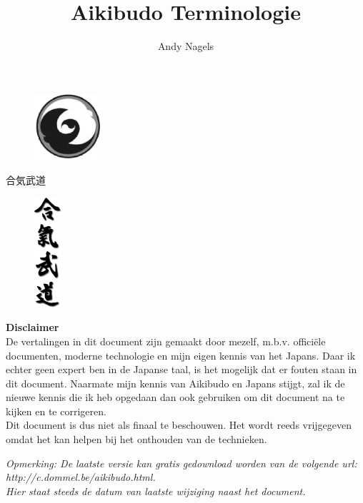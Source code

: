 \documentclass[a4paper, 12pt]{article}
\begin{document}
\begin{CJK}{UTF8}{min}
\CJKtilde

%
%
\title{Aikibudo Terminologie}
\author{Andy Nagels}
\maketitle
\thispagestyle{empty} %
\begin{figure}[H]
\centering
\includegraphics[width=2.5cm]{img/schild_aikibudo.eps}
\end{figure}

\begin{center}
合気武道
\end{center}

\begin{figure}[H]
\centering
\includegraphics[width=1.0cm]{img/aikibudo-kanji.eps}
\end{figure}

%
%
\newpage
\begin{center}
\textbf{Disclaimer}\\
De vertalingen in dit document zijn gemaakt door mezelf, m.b.v. offici\"{e}le documenten, moderne technologie en mijn eigen kennis van het Japans. Daar ik echter geen expert ben in de Japanse taal, is het mogelijk dat er fouten staan in dit document. Naarmate mijn kennis van Aikibudo en Japans stijgt, zal ik de nieuwe kennis die ik heb opgedaan dan ook gebruiken om dit document na te kijken en te corrigeren.\\
Dit document is dus niet als finaal te beschouwen. Het wordt reeds vrijgegeven omdat het kan helpen bij het onthouden van de technieken.
\end{center}
\begin{center}
\textit{{\em Opmerking:} De laatste versie kan gratis gedownload worden van de volgende url: http://c.dommel.be/aikibudo.html.\\
Hier staat steeds de datum van laatste wijziging naast het document.}
\end{center}


\end{CJK}
\end{document}
